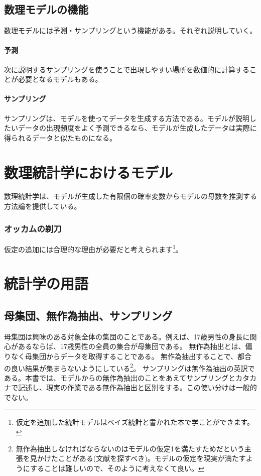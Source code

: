 \begin{brokenbox}[colback=yellow]
    \blindtext[5]
  \end{brokenbox}
\fi 
\subsection{数理モデルの機能}
数理モデルには予測・サンプリングという機能がある。それぞれ説明していく。
\paragraph{予測}

次に説明するサンプリングを使うことで出現しやすい場所を数値的に計算することが必要となるモデルもある。

\paragraph{サンプリング}
サンプリングは、モデルを使ってデータを生成する方法である。モデルが説明したいデータの出現頻度をよく予測できるなら、モデルが生成したデータは実際に得られるデータと似たものになる。

\section{数理統計学におけるモデル}
数理統計学は、モデルが生成した有限個の確率変数からモデルの母数を推測する方法論を提供している。



\subsubsection{オッカムの剃刀}

仮定の追加には合理的な理由が必要だと考えられます\footnote{仮定を追加した統計モデルはベイズ統計と書かれた本で学ことができます。}。

\begin{figure}
    \begin{center}
%
\end{center}
\end{figure}
\fi
\section{統計学の用語}

\subsection{母集団、無作為抽出、サンプリング}
母集団は興味のある対象全体の集団のことである。例えば、17歳男性の身長に関心があるならば、17歳男性の全員の集合が母集団である。
無作為抽出とは、偏りなく母集団からデータを取得することである。
無作為抽出することで、都合の良い結果が集まらないようにしている\footnote{無作為抽出しなければならないのはモデルの仮定1を満たすためだという主張を見かけたことがある(文献を探すべき)。モデルの仮定を現実が満たすようにすることは難しいので、そのように考えなくて良い。}。
サンプリングは無作為抽出の英訳である。本書では、モデルからの無作為抽出のことをあえてサンプリングとカタカナで記述し、現実の作業である無作為抽出と区別をする。この使い分けは一般的でない。

